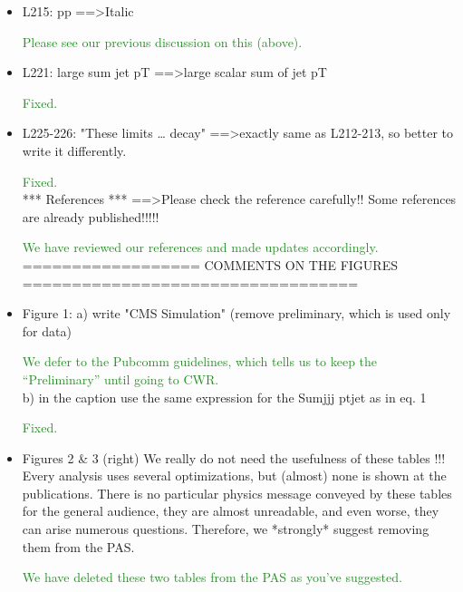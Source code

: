 \documentclass[paper=a4, fontsize=11pt]{scrartcl}
\begin{document}
\begin{itemize}
\item L215: 
pp ==\textgreater Italic 

\textcolor{ForestGreen}{Please see our previous discussion on this (above).}\\

\item L221: 
large sum jet pT ==\textgreater large scalar sum of jet pT 

\textcolor{ForestGreen}{Fixed.}\\

\item L225-226: 
"These limits … decay" ==\textgreater exactly same as L212-213, so better to write it 
differently. 

\textcolor{ForestGreen}{Fixed.}\\


*** References *** 
==\textgreater Please check the reference carefully!! Some references are already 
published!!!!! 

\textcolor{ForestGreen}{We have reviewed our references and made updates accordingly.}\\


================== COMMENTS ON THE FIGURES ================================== 


\item Figure 1: 
a) write "CMS Simulation" (remove preliminary, which is used only for data) 

\textcolor{ForestGreen}{We defer to the Pubcomm guidelines, which tells us to keep the ``Preliminary'' until
going to CWR.}\\

b) in the caption use the same expression for the Sumjjj ptjet as in eq. 1 

\textcolor{ForestGreen}{Fixed.}\\

\item Figures 2 \& 3 (right) 
We really do not need the usefulness of these tables !!! Every analysis uses 
several optimizations, but (almost) none is shown at the publications. There 
is no particular physics message conveyed by these tables for the general 
audience, they are almost unreadable, and even worse, they can arise numerous 
questions. Therefore, we *strongly* suggest removing them from the PAS. 

\textcolor{ForestGreen}{We have deleted these two tables from the PAS as you've suggested.}\\



\end{itemize}
\end{document}
